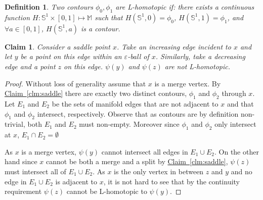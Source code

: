 \documentclass[11pt]{article}
\newtheorem{claim}[theorem]{Claim}
\newtheorem{definition}[theorem]{Definition}
\theoremstyle{definition}
\newcommand{\MM}{\mathbb{M}}
\newcommand{\SSS}{\mathbb{S}}
\newcommand{\eps}{\varepsilon}
\newcommand{\Clm}[1]{\hyperref[clm:#1]{Claim~\ref*{clm:#1}}} %
\begin{document}
\begin{definition} \label{def:cont-hom} Two contours $\phi_0, \phi_1$ are \emph{L-homotopic}
if: there exists a continuous function $H:\SSS^1 \times [0,1] \mapsto \MM$
such that $H(\SSS^1,0) = \phi_0$, $H(\SSS^1,1) = \phi_1$, and $\forall a \in [0,1]$,
$H(\SSS^1,a)$ is a contour.
\end{definition}

\begin{claim} \label{clm:non-hom} Consider a saddle point $x$. Take an increasing edge incident to $x$
and let $y$ be a point on this edge within an $\eps$-ball of $x$. Similarly, take a decreasing edge
and a point $z$ on this edge. $\psi(y)$ and $\psi(z)$ are not L-homotopic.
\end{claim}

\begin{proof}
Without loss of generality assume that $x$ is a merge vertex.  By \Clm{saddle} there are exactly two distinct contours, 
$\phi_1$ and $\phi_2$ through $x$.  Let $E_1$ and $E_2$ be the sets of manifold edges that are not adjacent to $x$ and that $\phi_1$ and $\phi_2$ intersect, respectively.
Observe that as contours are by definition non-trivial, both $E_1$ and $E_2$ must non-empty.  Moreover since $\phi_1$ and $\phi_2$ only intersect at $x$, $E_1\cap E_2 = \emptyset$

As $x$ is a merge vertex, $\psi(y)$ cannot intersect all edges in $E_1 \cup E_2$.
On the other hand since $x$ cannot be both a merge and a split by \Clm{saddle}, $\psi(z)$ must intersect all of $E_1 \cup E_2$.  As $x$ is the only vertex in between $z$ and $y$ 
and no edge in $E_1\cup E_2$ is adjacent to $x$, it is not hard to see that by the continuity requirement $\psi(z)$ cannot be L-homotopic to $\psi(y)$.
%
%
% 
% 
\end{proof}
\end{document}
